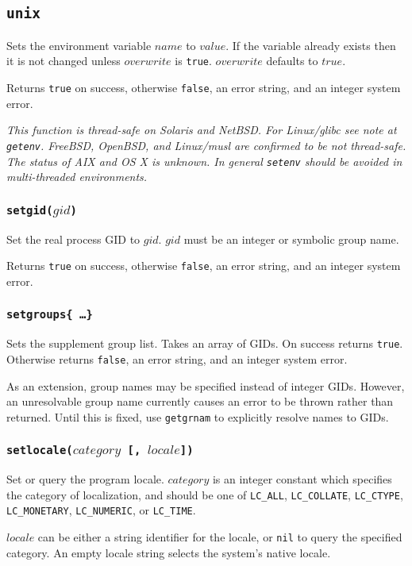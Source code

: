 \documentclass[11pt, oneside]{memoir}
\newcommand*{\true}[0]{\texttt{true}\xspace}
\newcommand*{\false}[0]{\texttt{false}\xspace}
\newcommand*{\nil}[0]{\texttt{nil}\xspace}
\newcommand*{\fn}[1]{\texttt{#1}\xspace}
\newcounter{toccols}
\newenvironment{Module}[1]{
	\subsection{\texttt{#1}}
	\addtocontents{toc}{
		\protect\begin{multicols}{\value{toccols}}
	}
}{
	\addtocontents{toc}{\protect\end{multicols}}
}
\begin{document}
\begin{Module}{unix}
Sets the environment variable $name$ to $value$. If the variable already exists then it is not changed unless $overwrite$ is \true. $overwrite$ defaults to $true$.

Returns \true on success, otherwise \false, an error string, and an integer system error.

\emph{This function is thread-safe on Solaris and NetBSD. For Linux/glibc see note at \fn{getenv}. FreeBSD, OpenBSD, and Linux/musl are confirmed to be not thread-safe. The status of AIX and OS X is unknown. In general \fn{setenv} should be avoided in multi-threaded environments.}

\subsubsection[\fn{setgid}]{\fn{setgid($gid$)}}

Set the real process GID to $gid$. $gid$ must be an integer or symbolic group name.

Returns \true on success, otherwise \false, an error string, and an integer system error.

\subsubsection[\fn{setgroups}]{\fn{setgroups\{ \ldots \}}}

Sets the supplement group list. Takes an array of GIDs. On success returns \true. Otherwise returns \false, an error string, and an integer system error.

As an extension, group names may be specified instead of integer GIDs. However, an unresolvable group name currently causes an error to be thrown rather than returned. Until this is fixed, use \fn{getgrnam} to explicitly resolve names to GIDs.

\subsubsection[\fn{setlocale}]{\fn{setlocale($category$ [, $locale$])}}

Set or query the program locale. $category$ is an integer constant which specifies the category of localization, and should be one of \texttt{LC\_ALL}, \texttt{LC\_COLLATE}, \texttt{LC\_CTYPE}, \texttt{LC\_MONETARY}, \texttt{LC\_NUMERIC}, or \texttt{LC\_TIME}.

$locale$ can be either a string identifier for the locale, or \nil to query the specified category. An empty locale string selects the system's native locale.


\end{Module}
\end{document}
